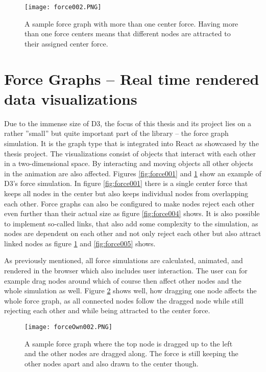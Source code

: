 \begin{figure}
  \centering
  \texttt{[image: force002.PNG]}
  \caption{A sample force graph with more than one center force. Having more than one force centers means that different nodes are attracted to their assigned center force.}
  \label{fig:force002}
\end{figure}

\section{Force Graphs -- Real time rendered data visualizations}

Due to the immense size of D3, the focus of this thesis and its project lies on a rather ''small'' but quite important part of the library -- the force graph simulation. It is the graph type that is integrated into React as showcased by the thesis project. The visualizations consist of objects that interact with each other in a two-dimensional space. By interacting and moving objects all other objects in the animation are also affected. Figures \ref{fig:force001} and \ref{fig:force002} show an example of D3's force simulation. In figure \ref{fig:force001} there is a single center force that keeps all nodes in the center but also keeps individual nodes from overlapping each other. Force graphs can also be configured to make nodes reject each other even further than their actual size as figure \ref{fig:force004} shows. It is also possible to implement so-called links, that also add some complexity to the simulation, as nodes are dependent on each other and not only reject each other but also attract linked nodes as figure \ref{fig:force002} and \ref{fig:force005} shows.

As previously mentioned, all force simulations are calculated, animated, and rendered in the browser which also includes user interaction. The user can for example drag nodes around which of course then affect other nodes and the whole simulation as well. Figure \ref{fig:force003} shows well, how dragging one node affects the whole force graph, as all connected nodes follow the dragged node while still rejecting each other and while being attracted to the center force.

\begin{figure}
  \centering
  \texttt{[image: forceOwn002.PNG]}
  \caption{A sample force graph where the top node is dragged up to the left and the other nodes are dragged along. The force is still keeping the other nodes apart and also drawn to the center though.}
  \label{fig:force003}
\end{figure}

